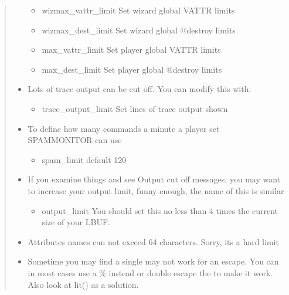 \documentclass[letterpaper,10pt,english]{sphinxmanual}
\begin{document}
\begin{quote}
\begin{itemize}
\begin{itemize}
\item {} 
\sphinxAtStartPar
wizmax\_vattr\_limit   \sphinxhyphen{} Set wizard global VATTR limits

\item {} 
\sphinxAtStartPar
wizmax\_dest\_limit    \sphinxhyphen{} Set wizard global @destroy limits

\item {} 
\sphinxAtStartPar
max\_vattr\_limit      \sphinxhyphen{} Set player global VATTR limits

\item {} 
\sphinxAtStartPar
max\_dest\_limit       \sphinxhyphen{} Set player global @destroy limits

\end{itemize}

\item {} 
\sphinxAtStartPar
Lots of trace output can be cut off.  You can modify this with:
\begin{itemize}
\item {} 
\sphinxAtStartPar
trace\_output\_limit   \sphinxhyphen{} Set lines of trace output shown

\end{itemize}

\item {} 
\sphinxAtStartPar
To define how many commands a minute a player set SPAMMONITOR can use
\begin{itemize}
\item {} 
\sphinxAtStartPar
spam\_limit \sphinxhyphen{}\sphinxhyphen{} default 120

\end{itemize}

\item {} 
\sphinxAtStartPar
If you examine things and see \textquotesingle{}Output cut off\textquotesingle{} messages, you may want
to increase your output limit, funny enough, the name of this is
similar
\begin{itemize}
\item {} 
\sphinxAtStartPar
output\_limit \sphinxhyphen{} You should set this no less than 4 times the current size of your LBUF.

\end{itemize}

\item {} 
\sphinxAtStartPar
Attributes names can not exceed 64 characters.  Sorry, it\textquotesingle{}s a hard limit

\item {} 
\sphinxAtStartPar
Sometime you may find a single may not work for an escape.  You can
in most cases use a \% instead or double escape the to make it work.
Also look at lit() as a solution.

\end{itemize}
\end{quote}
\end{document}
